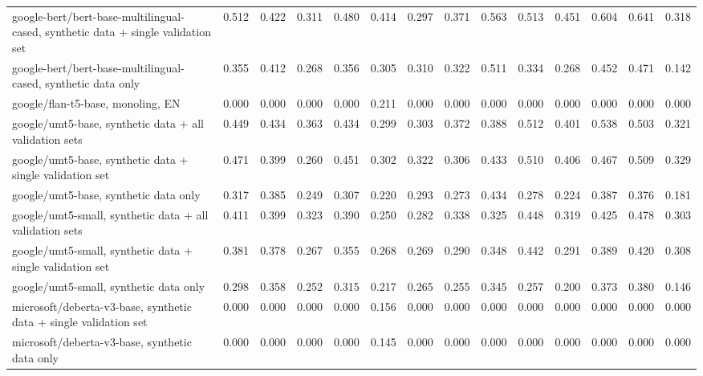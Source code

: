 \begin{landscape}
\begin{tabular}{lccccccccccccc}
google-bert/bert-base-multilingual-cased, synthetic data + single validation set & 0.512 & 0.422 & 0.311 & 0.480 & 0.414 & 0.297 & 0.371 & 0.563 & 0.513 & 0.451 & 0.604 & 0.641 & 0.318 \\
google-bert/bert-base-multilingual-cased, synthetic data only & 0.355 & 0.412 & 0.268 & 0.356 & 0.305 & 0.310 & 0.322 & 0.511 & 0.334 & 0.268 & 0.452 & 0.471 & 0.142 \\
google/flan-t5-base, monoling, EN & 0.000 & 0.000 & 0.000 & 0.000 & 0.211 & 0.000 & 0.000 & 0.000 & 0.000 & 0.000 & 0.000 & 0.000 & 0.000 \\
google/umt5-base, synthetic data + all validation sets & 0.449 & 0.434 & 0.363 & 0.434 & 0.299 & 0.303 & 0.372 & 0.388 & 0.512 & 0.401 & 0.538 & 0.503 & 0.321 \\
google/umt5-base, synthetic data + single validation set & 0.471 & 0.399 & 0.260 & 0.451 & 0.302 & 0.322 & 0.306 & 0.433 & 0.510 & 0.406 & 0.467 & 0.509 & 0.329 \\
google/umt5-base, synthetic data only & 0.317 & 0.385 & 0.249 & 0.307 & 0.220 & 0.293 & 0.273 & 0.434 & 0.278 & 0.224 & 0.387 & 0.376 & 0.181 \\
google/umt5-small, synthetic data + all validation sets & 0.411 & 0.399 & 0.323 & 0.390 & 0.250 & 0.282 & 0.338 & 0.325 & 0.448 & 0.319 & 0.425 & 0.478 & 0.303 \\
google/umt5-small, synthetic data + single validation set & 0.381 & 0.378 & 0.267 & 0.355 & 0.268 & 0.269 & 0.290 & 0.348 & 0.442 & 0.291 & 0.389 & 0.420 & 0.308 \\
google/umt5-small, synthetic data only & 0.298 & 0.358 & 0.252 & 0.315 & 0.217 & 0.265 & 0.255 & 0.345 & 0.257 & 0.200 & 0.373 & 0.380 & 0.146 \\
microsoft/deberta-v3-base, synthetic data + single validation set & 0.000 & 0.000 & 0.000 & 0.000 & 0.156 & 0.000 & 0.000 & 0.000 & 0.000 & 0.000 & 0.000 & 0.000 & 0.000 \\
microsoft/deberta-v3-base, synthetic data only & 0.000 & 0.000 & 0.000 & 0.000 & 0.145 & 0.000 & 0.000 & 0.000 & 0.000 & 0.000 & 0.000 & 0.000 & 0.000 \\
\hline
\end{tabular}
\end{landscape}
